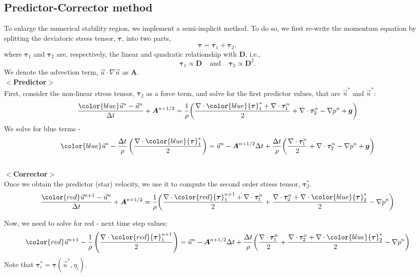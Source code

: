 \subsection{Predictor-Corrector method}
To enlarge the numerical stability region, we implement a semi-implicit method. To do so, we first re-write the momentum equation by splitting the deviatoric stress tensor, ${\bm \tau}$, into two parts, 
\[
 {\bm \tau}= {\bm \tau_1} + {\bm \tau_2},
\] 
where ${\bm \tau_1}$ and ${\bm \tau_2}$ are, respectively, the linear and quadratic relationship with ${\bm D}$, i.e., 
\[
  {\boldsymbol \tau_1} \propto \boldsymbol{D}
  \ \ \ \ \ \text{and}
   \ \ \ \ \ 
{\boldsymbol \tau_2} \propto {\boldsymbol D^2}.
\]
We denote the advection term, $\vec{u} \cdot \nabla \vec{u}$ as ${\bm A}$. 
\\
$<${\bf Predictor}$>$
\\
First, consider the non-linear stress tensor, ${\bm \tau_2}$ as a force term, and solve for the first predictor values, that are $\vec{u}^*$ and $\vec{u}^*$:
\[
\frac{{\color{blue}\vec{u}^*} - \vec{u}^n}{\Delta t} 
+  {\bm A}^{n+1/2} 
= \frac{1}{\rho}  \biggl(
\frac{\nabla \cdot {\color{blue}{\bm \tau}_1^*} + \nabla \cdot{\bm \tau}_1^n}{2} 
+ \nabla \cdot {\bm \tau}_2^n 
- \nabla p^n
+{\bm g}
\biggr)
\]
We solve for blue terms - 
\[
{\color{blue}\vec{u}^*} -
\frac{\Delta t}{\rho} 
\left( 
\frac{\nabla \cdot {\color{blue}{\bm \tau}_1^*}}{2}
\right)
=
\vec{u}^n
- {\bm A}^{n+1/2} \Delta t
+ \frac{\Delta t}{\rho} \biggl(
\frac{ \nabla \cdot{\bm \tau}_1^n}{2} 
+ \nabla \cdot {\bm \tau}_2^n 
- \nabla p^n
+{\bm g}
\biggr)
\]
\\
$<${\bf Corrector}$>$
\\
Once we obtain the predictor (star) velocity, we use it to compute the second order stress tensor, ${\bm \tau}_2^*$.
\[
\frac{{\color{red}\vec{u}^{n+1}} - \vec{u}^n}{\Delta t} 
+  {\bm A}^{n+1/2} 
=  \frac{1}{\rho}  \biggl(
\frac{\nabla \cdot {\color{red}{\bm \tau}_1^{n+1}} + \nabla \cdot{\bm \tau}_1^n}{2} 
+ \frac{\nabla \cdot {\bm \tau}_2^{n} + \nabla \cdot {\color{blue}{\bm \tau}_2^*}}{2} 
- \nabla p^n
\biggr)
\]

Now, we need to solve for red - next time step values:
\[
{\color{red}\vec{u}^{n+1}} 
-\frac{1}{\rho} 
\left(
\frac{\nabla \cdot {\color{red}{\bm \tau}_1^{n+1}}}{2}
\right)
=
\vec{u}^n 
 -{\bm A}^{n+1/2} \Delta t
 +\frac{\Delta t}{\rho}  \biggl(
\frac{ \nabla \cdot{\bm \tau}_1^n}{2} 
+ \frac{\nabla \cdot {\bm \tau}_2^{n} + \nabla \cdot {\color{blue}{\bm \tau}_2^*}}{2} 
- \nabla p^n
\biggr)
\]
Note that ${\bm \tau}_i^* = {\bm \tau}(\vec{u}^*, \eta_i)$.






